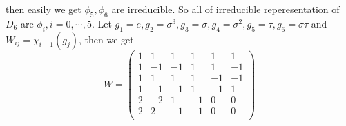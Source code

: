 \documentclass{ctexart}
\begin{document}
\begin{solution}
\begin{enumerate}
          then easily we get \(\phi_5,\phi_6\) are irreducible. So all of irreducible reperesentation of \(D_6\) are \(\phi_i,i=0,\cdots,5\). 
          Let \(g_1=e,g_2=\sigma^3,g_3=\sigma,g_4=\sigma^2,g_5=\tau,g_6=\sigma \tau\) and \(W_{ij}=\chi_{i-1}( g_j)\), then we get 
          \[
            W=\begin{pmatrix}
            1 & 1 & 1 & 1 & 1 & 1\\
            1 & -1 & -1 & 1 & 1 & -1\\
            1 & 1 & 1 & 1 & -1 & -1\\
            1 & -1 & -1 & 1 & -1 & 1\\
            2 & -2 & 1 & -1 & 0 & 0\\
            2 & 2 & -1 & -1 & 0 & 0\\
            \end{pmatrix}
          \]
  \end{enumerate}
\end{solution}
\end{document}
